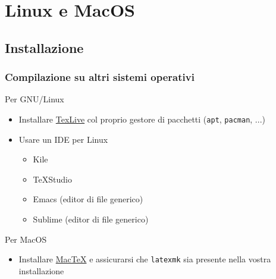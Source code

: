 \section{Linux e MacOS}
\subsection{Installazione}
\begin{frame}
  \frametitle{Compilazione su altri sistemi operativi}
  
  Per GNU/Linux
  \begin{itemize}
   \item Installare \href{http://www.tug.org/texlive/}{TexLive} col proprio 
gestore di pacchetti (\texttt{apt}, \texttt{pacman}, ...)
   \item Usare un IDE per Linux
   \begin{itemize}
    \item Kile
    \item TeXStudio
    \item Emacs (editor di file generico)
    \item Sublime (editor di file generico)
   \end{itemize}
  \end{itemize}
  
  Per MacOS
  \begin{itemize}
   \item Installare \href{http://www.tug.org/mactex/}{MacTeX} e assicurarsi che 
\texttt{latexmk} sia presente nella vostra installazione 
  \end{itemize}
\end{frame}



